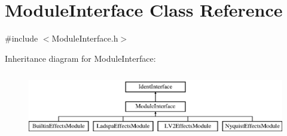 \hypertarget{class_module_interface}{}\section{Module\+Interface Class Reference}
\label{class_module_interface}


{\ttfamily \#include $<$Module\+Interface.\+h$>$}

Inheritance diagram for Module\+Interface\+:\begin{figure}[H]
\begin{center}
\leavevmode
\includegraphics[height=2.957747cm]{class_module_interface}
\end{center}
\end{figure}
